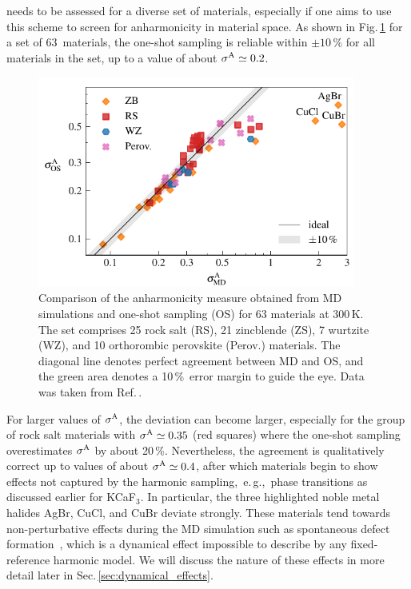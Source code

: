  needs to be assessed for a diverse set of materials, especially if one aims to use this scheme to screen for anharmonicity in material space. As shown in Fig.\,\ref{fig:anh.screening} for a set of 63~materials, the one-shot sampling is reliable within $\pm 10\,\%$ for all materials in the set, up to a value of about $\sigma^\mathrm{A} \simeq 0.2$.
\begin{figure}
	\includegraphics[width=4.1in]{./data/plots/anharmonicity/8_screening/sigma_os_md.pdf}
	\caption{
		Comparison of the anharmonicity measure obtained from MD simulations and one-shot sampling (OS) for 63 materials at 300\,K. The set comprises 25 rock salt (RS), 21 zincblende (ZS), 7 wurtzite (WZ), and 10 orthorombic perovskite (Perov.) materials. The diagonal line denotes perfect agreement between MD and OS, and the green area denotes a 10\,\%~error margin to guide the eye.
		Data was taken from Ref.\,\cite{Knoop.2020}.
	}
	\label{fig:anh.screening}
\end{figure}
For larger values of $\sigma^\mathrm{A}$, the deviation can become larger, especially for the group of rock salt materials with $\sigma^\mathrm{A} \simeq 0.35$ (red squares) where the one-shot sampling overestimates $\sigma^\mathrm{A}$ by about 20\,\%. Nevertheless, the agreement is qualitatively correct up to values of about $\sigma^\mathrm{A} \simeq 0.4$, after which materials begin to show effects not captured by the harmonic sampling,~e.\,g.,~phase transitions as discussed earlier for KCaF$_3$. In particular, the three highlighted noble metal halides AgBr, CuCl, and CuBr deviate strongly. These materials tend towards non-perturbative effects during the MD simulation such as spontaneous defect formation~\cite{Knoop.2020}, which is a dynamical effect impossible to describe by any fixed-reference harmonic model. We will discuss the nature of these effects in more detail later in Sec.\,\ref{sec:dynamical_effects}. 

